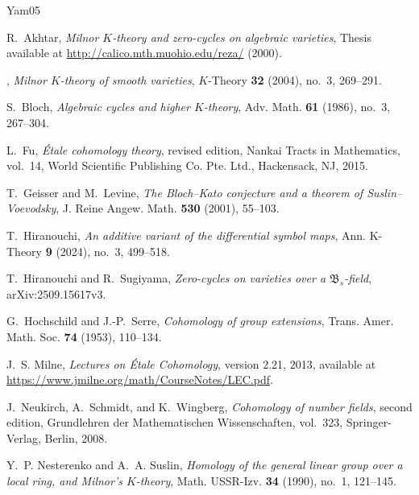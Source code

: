 \documentclass[a4paper,12pt]{amsart}
\numberwithin{equation}{section}
\theoremstyle{definition}
\begin{document}
\begin{thebibliography}{Yam05}

R.~Akhtar, \emph{Milnor {$K$}-theory and zero-cycles on algebraic varieties},
Thesis available at \url{http://calico.mth.muohio.edu/reza/} (2000).

\bysame, \emph{Milnor {$K$}-theory of smooth varieties}, $K$-Theory
\textbf{32} (2004), no.~3, 269--291.

S.~Bloch, \emph{Algebraic cycles and higher {$K$}-theory}, Adv. Math.
\textbf{61} (1986), no.~3, 267--304.

L.~Fu, \emph{\'Etale cohomology theory}, revised edition,
Nankai Tracts in Mathematics, vol.~14, World Scientific Publishing Co.
Pte. Ltd., Hackensack, NJ, 2015.

T.~Geisser and M.~Levine,
\emph{The Bloch--Kato conjecture and a theorem of Suslin--Voevodsky},
J. Reine Angew. Math. \textbf{530} (2001), 55--103.

T.~Hiranouchi, \emph{An additive variant of the differential symbol maps}, Ann. K-Theory \textbf{9} (2024), no.~3, 499--518.

T.~Hiranouchi and R.~Sugiyama, \emph{Zero-cycles on varieties over a $\mathfrak{B}_s$-field}, arXiv:2509.15617v3. 


G.~Hochschild and J.-P.~Serre, \emph{Cohomology of group extensions},
Trans. Amer. Math. Soc. \textbf{74} (1953), 110--134.




J.~S. Milne, \emph{Lectures on \'Etale Cohomology}, version 2.21,
2013, available at \url{https://www.jmilne.org/math/CourseNotes/LEC.pdf}.

J.~Neukirch, A.~Schmidt, and K.~Wingberg,
\emph{Cohomology of number fields}, second edition,
Grundlehren der Mathematischen Wissenschaften, vol.~323,
Springer-Verlag, Berlin, 2008.

Y.~P. Nesterenko and A.~A. Suslin, \emph{Homology of the general linear group
over a local ring, and {M}ilnor's {$K$}-theory}, Math. USSR-Izv. \textbf{34}
(1990), no.~1, 121--145.


\end{thebibliography}
\end{document}

